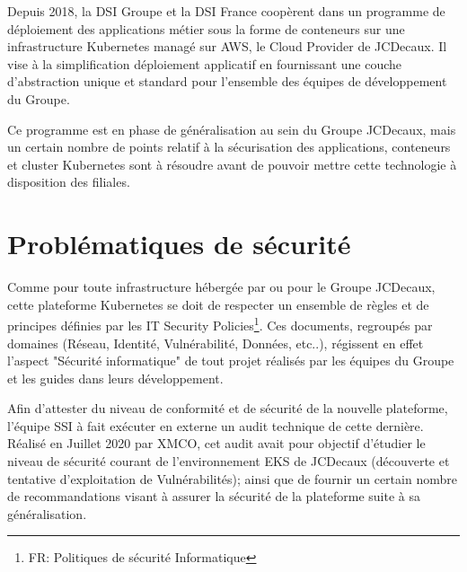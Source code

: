 Depuis 2018, la \ac{DSI} Groupe et la \ac{DSI} France coopèrent dans un programme de déploiement des applications métier sous la forme
de conteneurs sur une infrastructure Kubernetes managé sur \ac{AWS}, le Cloud Provider de JCDecaux. Il vise à la simplification
déploiement applicatif en fournissant une couche d'abstraction unique et standard pour l'ensemble des équipes de développement du Groupe.

Ce programme est en phase de généralisation au sein du Groupe JCDecaux, mais un certain nombre de points relatif à la sécurisation des
applications, conteneurs et cluster Kubernetes sont à résoudre avant de pouvoir mettre cette technologie à disposition des filiales.

\section{Problématiques de sécurité}
Comme pour toute infrastructure hébergée par ou pour le Groupe JCDecaux, cette plateforme Kubernetes se doit de respecter un ensemble de 
règles et de principes définies par les IT Security Policies\footnote{FR: Politiques de sécurité Informatique}. Ces documents, 
regroupés par domaines (Réseau, Identité, Vulnérabilité, Données, etc..), régissent en effet l'aspect "Sécurité informatique" de tout projet
réalisés par les équipes du Groupe et les guides dans leurs développement.

Afin d'attester du niveau de conformité et de sécurité de la nouvelle plateforme, l'équipe \ac{SSI} à fait exécuter en externe un audit 
technique de cette dernière. Réalisé en Juillet 2020 par XMCO, cet audit avait pour objectif d'étudier le niveau de sécurité courant de 
l'environnement \ac{EKS} de JCDecaux (découverte et tentative d'exploitation de Vulnérabilités); ainsi que de fournir un certain nombre 
de recommandations visant à assurer la sécurité de la plateforme suite à sa généralisation.

